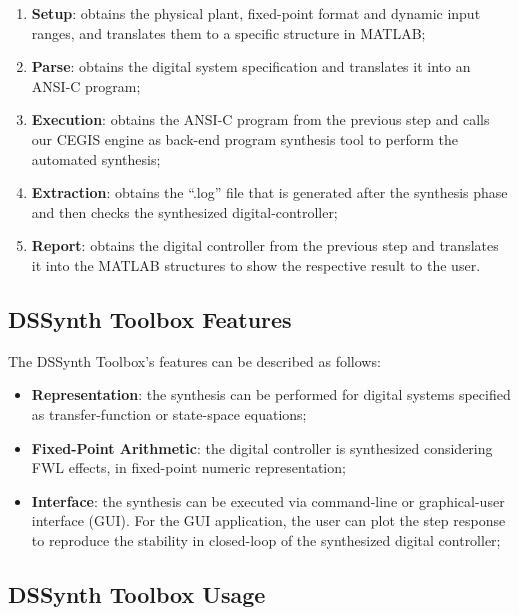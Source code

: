 \documentclass[10pt,conference]{IEEEtran}
\newcommand\tool{{DSSynth Toolbox}\xspace}
\begin{document}
\begin{enumerate}
\item \textbf{Setup}: obtains the physical plant, fixed-point format 
and dynamic input ranges, and translates them to a specific structure in MATLAB;
\item \textbf{Parse}: obtains the digital system specification and translates 
it into an ANSI-C program;
\item \textbf{Execution}: obtains the ANSI-C program from the previous step 
and calls our CEGIS engine as back-end program synthesis tool to perform the automated synthesis;
\item \textbf{Extraction}: obtains the ``.log'' file that is generated 
after the synthesis phase and then checks the synthesized digital-controller;
\item \textbf{Report}: obtains the digital controller from the previous step 
and translates it into the MATLAB structures to show the respective result to the user.
\end{enumerate}

\subsection{\tool Features}

The \tool's features can be described as follows:

\begin{itemize}
\item \textbf{Representation}: the synthesis can be 
performed for digital systems specified as 
transfer-function or state-space equations;
\item \textbf{Fixed-Point Arithmetic}: the digital 
controller is synthesized considering FWL effects, 
in fixed-point numeric representation;
\item \textbf{Interface}: the synthesis can be executed 
via command-line or graphical-user interface (GUI). 
For the GUI application, the user can plot the step response 
to reproduce the stability in closed-loop of the synthesized digital controller;
\end{itemize}

\subsection{\tool Usage}
\end{document}
